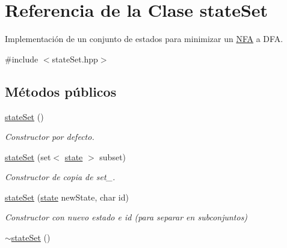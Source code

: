 \hypertarget{classstate_set}{}\section{Referencia de la Clase state\+Set}
\label{classstate_set}


Implementación de un conjunto de estados para minimizar un \mbox{\hyperlink{class_n_f_a}{N\+FA}} a D\+FA.  




{\ttfamily \#include $<$state\+Set.\+hpp$>$}

\subsection*{Métodos públicos}
\begin{DoxyCompactItemize}
\item 
\mbox{\label{classstate_set_a83d605e4a82190945aca7c784af3379c}} 
\mbox{\hyperlink{classstate_set_a83d605e4a82190945aca7c784af3379c}{state\+Set}} ()
\begin{DoxyCompactList}\small\item\em Constructor por defecto. \end{DoxyCompactList}\item 
\mbox{\label{classstate_set_ae136d82fa85d07a0f357851eedeb900a}} 
\mbox{\hyperlink{classstate_set_ae136d82fa85d07a0f357851eedeb900a}{state\+Set}} (set$<$ \mbox{\hyperlink{classstate}{state}} $>$ subset)
\begin{DoxyCompactList}\small\item\em Constructor de copia de set\+\_\+. \end{DoxyCompactList}\item 
\mbox{\label{classstate_set_a438223ae48b78e44280dbb70fae81973}} 
\mbox{\hyperlink{classstate_set_a438223ae48b78e44280dbb70fae81973}{state\+Set}} (\mbox{\hyperlink{classstate}{state}} new\+State, char id)
\begin{DoxyCompactList}\small\item\em Constructor con nuevo estado e id (para separar en subconjuntos) \end{DoxyCompactList}\item 
\mbox{\label{classstate_set_a4314f7fdb86305cdcd81f49d255e9d77}} 
\mbox{\hyperlink{classstate_set_a4314f7fdb86305cdcd81f49d255e9d77}{$\sim$state\+Set}} ()

\end{DoxyCompactItemize}

